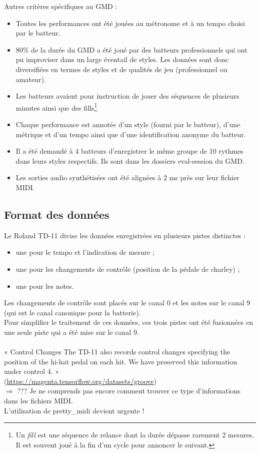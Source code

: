 Autres critères spécifiques au GMD :
\begin{itemize}
	\item Toutes les performances ont été jouées au métronome et à un tempo
        choisi par le batteur.
	\item 80\% de la durée du GMD a été joué par des batteurs professionnels
        qui ont pu improviser dans un large éventail de styles. Les données
        sont donc diversifiées en termes de styles et de qualités de jeu (professionnel ou amateur).
	\item Les batteurs avaient pour instruction de jouer des séquences de plusieurs minutes ainsi que des fills\footnote{Un \textit{fill} est une séquence de relance dont la durée dépasse rarement 2 mesures. Il est souvent joué à la fin d’un cycle pour annoncer le suivant.}
	\item Chaque performance est annotée d’un style (fourni par le batteur), d’une métrique et d’un tempo ainsi que d’une identification anonyme du batteur.
	\item Il a été demandé à 4 batteurs d’enregistrer le même groupe de 10 rythmes dans leurs styles respectifs. Ils sont dans les dossiers eval-session du GMD.
	\item Les sorties audio synthétisées ont été alignées à 2 ms près sur leur fichier MIDI.
\end{itemize}
\subsection*{Format des données}
Le Roland TD-11 divise les données enregistrées en plusieurs pistes distinctes :
\begin{itemize}
	\item une pour le tempo et l’indication de mesure ;
	\item une pour les changements de contrôle (position de la pédale de charley) ;
	\item une pour les notes.\\
\end{itemize}
Les changements de contrôle sont placés sur le canal 0 et les notes sur le canal 9 (qui est le canal canonique pour la batterie).\\
Pour simplifier le traitement de ces données, ces trois pistes ont été fusionnées en une seule piste qui a été mise sur le canal 9.\\\\
« Control Changes
The TD-11 also records control changes specifying the position of the hi-hat pedal on each hit. We have preserved this information under control 4. »\\(\url{https://magenta.tensorflow.org/datasets/groove})\\$\Rightarrow$ ??? Je ne comprends pas encore comment trouver ce type d’informations dans les fichiers MIDI.\\L’utilisation de pretty\_midi devient urgente !
